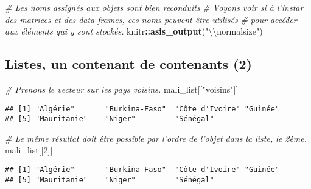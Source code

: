 \documentclass[]{book}
\newenvironment{Shaded}{\begin{snugshade}}{\end{snugshade}}
\newcommand{\KeywordTok}[1]{\textcolor[rgb]{0.13,0.29,0.53}{\textbf{#1}}}
\newcommand{\DecValTok}[1]{\textcolor[rgb]{0.00,0.00,0.81}{#1}}
\newcommand{\CharTok}[1]{\textcolor[rgb]{0.31,0.60,0.02}{#1}}
\newcommand{\StringTok}[1]{\textcolor[rgb]{0.31,0.60,0.02}{#1}}
\newcommand{\CommentTok}[1]{\textcolor[rgb]{0.56,0.35,0.01}{\textit{#1}}}
\newcommand{\OperatorTok}[1]{\textcolor[rgb]{0.81,0.36,0.00}{\textbf{#1}}}
\newcommand{\NormalTok}[1]{#1}
\begin{document}
\begin{Shaded}
\begin{Highlighting}[]
\CommentTok{# Les noms assignés aux objets sont bien reconduits}
\CommentTok{# Voyons voir si à l'instar des matrices et des data frames, ces noms peuvent être utilisés}
\CommentTok{# pour accéder aux éléments qui y sont stockés.}
\NormalTok{knitr}\OperatorTok{::}\KeywordTok{asis_output}\NormalTok{(}\StringTok{"}\CharTok{\textbackslash{}\textbackslash{}}\StringTok{normalsize"}\NormalTok{)}
\end{Highlighting}
\end{Shaded}

\normalsize

\subsection{Listes, un contenant de contenants
(2)}\label{listes-un-contenant-de-contenants-2}

\tiny

\begin{Shaded}
\begin{Highlighting}[]
\CommentTok{# Prenons le vecteur sur les pays voisins.}
\NormalTok{mali_list[[}\StringTok{"voisins"}\NormalTok{]]}
\end{Highlighting}
\end{Shaded}

\begin{verbatim}
## [1] "Algérie"       "Burkina-Faso"  "Côte d'Ivoire" "Guinée"       
## [5] "Mauritanie"    "Niger"         "Sénégal"
\end{verbatim}

\begin{Shaded}
\begin{Highlighting}[]
\CommentTok{# Le même résultat doit être possible par l'ordre de l'objet dans la liste, le 2ème.}
\NormalTok{mali_list[[}\DecValTok{2}\NormalTok{]]}
\end{Highlighting}
\end{Shaded}

\begin{verbatim}
## [1] "Algérie"       "Burkina-Faso"  "Côte d'Ivoire" "Guinée"       
## [5] "Mauritanie"    "Niger"         "Sénégal"
\end{verbatim}

\begin{Shaded}
\end{Shaded}
\end{document}
